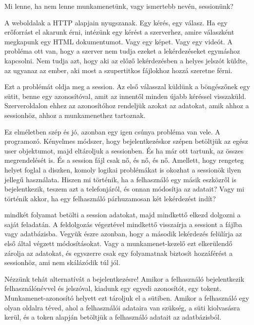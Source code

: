 
Mi lenne, ha nem lenne munkamenetünk, vagy ismertebb nevén, sessionünk?

A weboldalak a HTTP alapjain nyugszanak. Egy kérés, egy válasz. Ha egy erőforrást el akarunk érni, intézünk egy kérést a szerverhez, amire válaszként megkapunk egy HTML dokumentumot. Vagy egy képet. Vagy egy videót. 
A probléma ott van, hogy a szerver nem tudja ezeket a lekérdezéseket egymáshoz kapcsolni. Nem tudja azt, hogy aki az előző lekérdezésben a helyes jelszót küldte, az ugyanaz az ember, aki most a szupertitkos fájlokhoz hozzá szeretne férni.

Ezt a problémát oldja meg a session. Az első válasszal küldünk a böngészőnek egy sütit, benne egy azonosítóval, amit az innentől minden újabb kéréssel visszaküld. Szerveroldalon ehhez az azonosítóhoz rendeljük azokat az adatokat, amik ahhoz a sessionhöz, ahhoz a munkamenethez tartoznak.

Ez elméletben szép és jó, azonban egy igen csúnya probléma van vele. A programozó.
Kényelmes módszer, hogy bejelentkezéskor szépen betöltjük az egész user objektumot, majd eltároljuk a sessionben. És ha már ott tartunk, az összes megrendelését is. És a session fájl csak nő, és nő, és nő.
Amellett, hogy rengeteg helyet foglal a diszken, komoly logikai problémákat is okozhat a sessionök ilyen jellegű használata. Hiszen mi történik, ha a felhasználó egy másik eszközről is bejelentkezik, teszem azt a telefonjáról, és onnan módosítja az adatait? Vagy mi történik akkor, ha egy felhasználó párhuzamosan két lekérdezést indít?

mindkét folyamat betölti a session adatokat, majd mindkettő elkezd dolgozni a saját feladatán. A feldolgozás végeztével mindkettő visszaírja a sessiont a fájlba vagy adatbázisba. Vegyük észre azonban, hogy a második lekérdezés felülírja az első által végzett módosításokat. Vagy a munkamenet-kezelő ezt elkerülendő zárolja az adatokat, és egyszerre csak egy folyamatnak biztosít hozzáférést a sessionhöz, ami nem skálázódik túl jól.

Nézzünk tehát alternatívát a bejelentkezésre!
Amikor a felhasználó bejelentkezik felhasználónévvel és jelszóval, kiadunk egy egyedi azonosítót, egy tokent. Munkamenet-azonosító helyett ezt tároljuk el a sütiben. Amikor a felhasználó egy olyan oldalra téved, ahol a felhasználói adataira van szükség, a süti kiolvasásra kerül, és a token alapján betöltjük a felhasználó adatait az adatbázisból.

